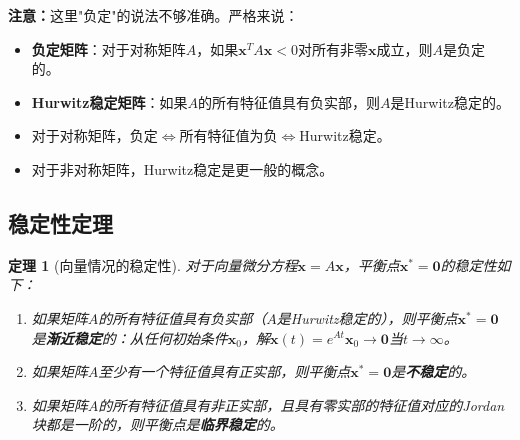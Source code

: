 \documentclass[12pt,a4paper]{article}
\newtheorem{theorem}{定理}
\begin{document}
\textbf{注意：}这里"负定"的说法不够准确。严格来说：
\begin{itemize}
\item \textbf{负定矩阵}：对于对称矩阵$A$，如果$\mathbf{x}^T A \mathbf{x} < 0$对所有非零$\mathbf{x}$成立，则$A$是负定的。
\item \textbf{Hurwitz稳定矩阵}：如果$A$的所有特征值具有负实部，则$A$是Hurwitz稳定的。
\item 对于对称矩阵，负定$\Leftrightarrow$所有特征值为负$\Leftrightarrow$Hurwitz稳定。
\item 对于非对称矩阵，Hurwitz稳定是更一般的概念。
\end{itemize}

\subsection{稳定性定理}

\begin{theorem}[向量情况的稳定性]
对于向量微分方程$\dot{\mathbf{x}} = A\mathbf{x}$，平衡点$\mathbf{x}^* = \mathbf{0}$的稳定性如下：
\begin{enumerate}
\item 如果矩阵$A$的所有特征值具有负实部（$A$是Hurwitz稳定的），则平衡点$\mathbf{x}^* = \mathbf{0}$是\textbf{渐近稳定}的：从任何初始条件$\mathbf{x}_0$，解$\mathbf{x}(t) = e^{At}\mathbf{x}_0 \to \mathbf{0}$当$t \to \infty$。
\item 如果矩阵$A$至少有一个特征值具有正实部，则平衡点$\mathbf{x}^* = \mathbf{0}$是\textbf{不稳定}的。
\item 如果矩阵$A$的所有特征值具有非正实部，且具有零实部的特征值对应的Jordan块都是一阶的，则平衡点是\textbf{临界稳定}的。
\end{enumerate}
\end{theorem}
\end{document}
